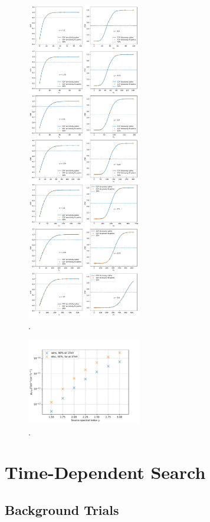 \begin{figure}
    \centering
    \includegraphics[width=5cm]{Plots/05_csky/9_years_gfu_gold_cdf.pdf}
    \caption{.}
\end{figure}

\begin{figure}
    \centering
    \includegraphics[width=5cm]{Plots/05_csky/time_int_sens_gfu_gold_9_years_new.pdf}
    \caption{.}
\end{figure}

\chapter{Time-Dependent Search}

\section{Background Trials}

